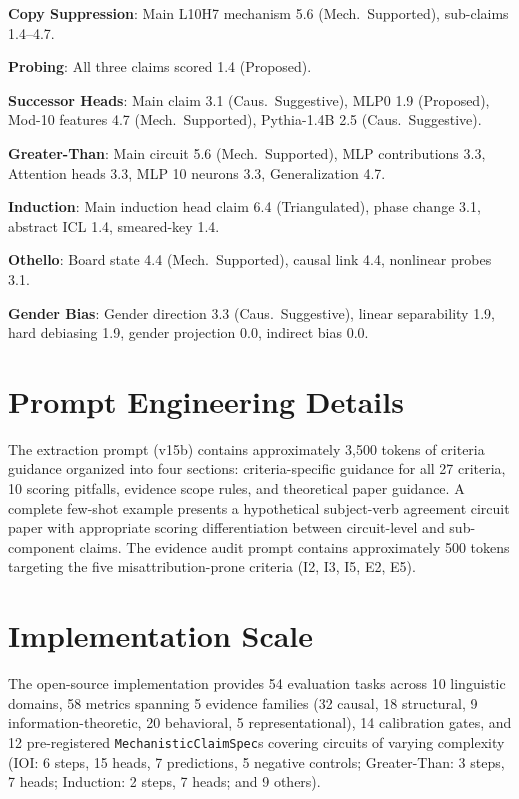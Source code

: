 \documentclass[10pt]{article}
\begin{document}
\textbf{Copy Suppression}: Main L10H7 mechanism 5.6 (Mech.\ Supported), sub-claims 1.4--4.7.

\textbf{Probing}: All three claims scored 1.4 (Proposed).

\textbf{Successor Heads}: Main claim 3.1 (Caus.\ Suggestive), MLP0 1.9 (Proposed), Mod-10 features 4.7 (Mech.\ Supported), Pythia-1.4B 2.5 (Caus.\ Suggestive).

\textbf{Greater-Than}: Main circuit 5.6 (Mech.\ Supported), MLP contributions 3.3, Attention heads 3.3, MLP 10 neurons 3.3, Generalization 4.7.

\textbf{Induction}: Main induction head claim 6.4 (Triangulated), phase change 3.1, abstract ICL 1.4, smeared-key 1.4.

\textbf{Othello}: Board state 4.4 (Mech.\ Supported), causal link 4.4, nonlinear probes 3.1.

\textbf{Gender Bias}: Gender direction 3.3 (Caus.\ Suggestive), linear separability 1.9, hard debiasing 1.9, gender projection 0.0, indirect bias 0.0.

\section{Prompt Engineering Details}
\label{app:prompts}

The extraction prompt (v15b) contains approximately 3,500 tokens of criteria guidance organized into four sections: criteria-specific guidance for all 27 criteria, 10 scoring pitfalls, evidence scope rules, and theoretical paper guidance. A complete few-shot example presents a hypothetical subject-verb agreement circuit paper with appropriate scoring differentiation between circuit-level and sub-component claims. The evidence audit prompt contains approximately 500 tokens targeting the five misattribution-prone criteria (I2, I3, I5, E2, E5).

\section{Implementation Scale}
\label{app:scale}

The open-source implementation provides 54 evaluation tasks across 10 linguistic domains, 58 metrics spanning 5 evidence families (32 causal, 18 structural, 9 information-theoretic, 20 behavioral, 5 representational), 14 calibration gates, and 12 pre-registered \texttt{MechanisticClaimSpec}s covering circuits of varying complexity (IOI: 6 steps, 15 heads, 7 predictions, 5 negative controls; Greater-Than: 3 steps, 7 heads; Induction: 2 steps, 7 heads; and 9 others).
\end{document}
